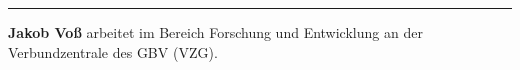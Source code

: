 \begin{center}\rule{0.5\linewidth}{\linethickness}\end{center}

\textbf{Jakob Voß} arbeitet im Bereich Forschung und Entwicklung an der
Verbundzentrale des GBV (VZG).
